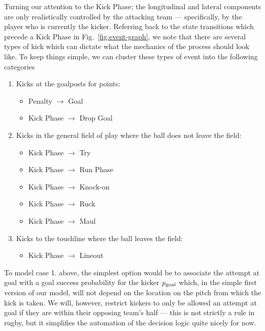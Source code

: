 Turning our attention to the {\sf Kick Phase}; the longitudinal and lateral components are only realistically controlled by the attacking team --- specifically, by the player who is currently the kicker. Referring back to the state transitions which precede a {\sf Kick Phase} in Fig.~\ref{fig:event-graph}, we note that there are several types of kick which can dictate what the mechanics of the process should look like. To keep things simple, we can cluster these types of event into the following categories
\begin{enumerate}
\item Kicks at the goalposts for points:
\begin{itemize}
    \item {\sf Penalty} $\longrightarrow$ {\sf Goal}
    \item {\sf Kick Phase} $\longrightarrow$ {\sf Drop Goal}
\end{itemize}
\item Kicks in the general field of play where the ball does not leave the field:
\begin{itemize}
    \item {\sf Kick Phase} $\longrightarrow$ {\sf Try}
    \item {\sf Kick Phase} $\longrightarrow$ {\sf Run Phase}
    \item {\sf Kick Phase} $\longrightarrow$ {\sf Knock-on}
    \item {\sf Kick Phase} $\longrightarrow$ {\sf Ruck}
    \item {\sf Kick Phase} $\longrightarrow$ {\sf Maul}
\end{itemize} 
\item Kicks to the touchline where the ball leaves the field:
\begin{itemize}
    \item {\sf Kick Phase} $\longrightarrow$ {\sf Lineout}
\end{itemize}  
\end{enumerate}

To model case 1. above, the simplest option would be to associate the attempt at goal with a goal success probability for the kicker $p_{\rm goal}$ which, in the simple first version of our model, will not depend on the location on the pitch from which the kick is taken. We will, however, restrict kickers to only be allowed an attempt at goal if they are within their opposing team's half --- this is not strictly a rule in rugby, but it simplifies the automation of the decision logic quite nicely for now.

